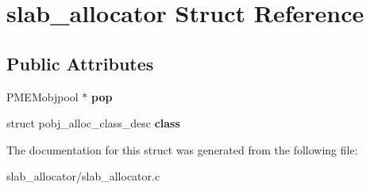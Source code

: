 \hypertarget{structslab__allocator}{}\section{slab\+\_\+allocator Struct Reference}
\label{structslab__allocator}
\subsection*{Public Attributes}
\begin{DoxyCompactItemize}
\item 
\mbox{\label{structslab__allocator_a2cc12484bbc383a416127a91bc77aacd}} 
P\+M\+E\+Mobjpool $\ast$ {\bfseries pop}
\item 
\mbox{\label{structslab__allocator_a3bd3b7f096bcc21f6f2c9e686ce0051e}} 
struct pobj\+\_\+alloc\+\_\+class\+\_\+desc {\bfseries class}
\end{DoxyCompactItemize}


The documentation for this struct was generated from the following file\+:\begin{DoxyCompactItemize}
\item 
slab\+\_\+allocator/slab\+\_\+allocator.\+c\end{DoxyCompactItemize}
